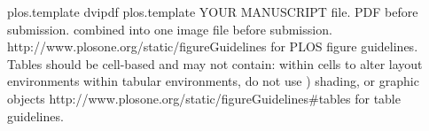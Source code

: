 plos.template %
dvipdf plos.template %
YOUR MANUSCRIPT %
file. %
PDF before submission. %
combined into one image file before submission. %
http://www.plosone.org/static/figureGuidelines for PLOS figure guidelines. %
Tables should be cell-based and may not contain: %
within cells to alter layout %
environments within tabular environments, do not use \multirow) %
shading, or graphic objects %
http://www.plosone.org/static/figureGuidelines#tables for table guidelines. %
